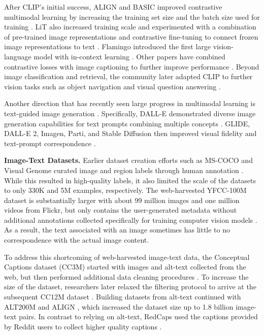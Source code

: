 After CLIP's initial success, ALIGN and BASIC improved contrastive multimodal learning by increasing the training set size and the batch size used for training \citep{ALIGN, basic}. LiT also increased training scale and experimented with a combination of pre-trained image representations and contrastive fine-tuning to connect frozen image representations to text \citep{zhai2021lit}. Flamingo introduced the first large vision-language model with in-context learning \citep{alayrac2022flamingo}. Other papers have combined contrastive losses with image captioning  to further improve performance \citep{yu2022coca,li2022blip}. Beyond image classification and retrieval, the community later adapted CLIP to further vision tasks such as object navigation and visual question answering \citep{mokady2021clipcap, khandelwal2021simple, shen2021much,cow}.

Another direction that has recently seen large progress in multimodal learning is text-guided image generation \citep{mansimov2015generating, reed2016generative, zhang2017stackgan}. Specifically, DALL-E demonstrated diverse image generation capabilities for text prompts combining multiple concepts \citep{DALL-E}. GLIDE, DALL-E 2, Imagen, Parti, and Stable Diffusion then improved visual fidelity and text-prompt correspondence \citep{GLIDE, imagen, DALLE-2, parti, rombach2021highresolution}. 

\textbf{Image-Text Datasets.} Earlier dataset creation efforts such as MS-COCO and Visual Genome curated image and region labels through human annotation \citep{lin2014microsoft, krishna2017visual}. While this resulted in high-quality labels, it also limited the scale of the datasets to only 330K and 5M examples, respectively. The web-harvested YFCC-100M dataset is substantially larger with about 99 million images and one million videos from Flickr, but only contains the user-generated metadata without additional annotations collected specifically for training computer vision models \citep{thomee2016yfcc100m}. As a result, the text associated with an image sometimes has little to no correspondence with the actual image content.

To address this shortcoming of web-harvested image-text data, the Conceptual Captions dataset (CC3M) started with images and alt-text collected from the web, but then performed additional data cleaning procedures \citep{sharma-etal-2018-conceptual}. To increase the size of the dataset, researchers later relaxed the filtering protocol to arrive at the subsequent CC12M dataset \citep{changpinyo2021conceptual}. Building datasets from alt-text continued with ALT200M \citep{hu2021scaling} and ALIGN \citep{ALIGN}, which increased the dataset size up to 1.8 billion image-text pairs. In contrast to relying on alt-text, RedCaps used the captions provided by Reddit users to collect higher quality captions \citep{desai2021redcaps}.

